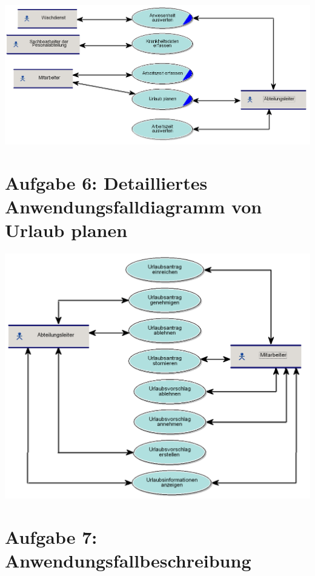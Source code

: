 \begin{center}
	\includegraphics[width=0.9\linewidth]{GrobesAnwendungsfalldiagramm.PNG}
\end{center}


\chapter*{Aufgabe 6: Detailliertes Anwendungsfalldiagramm von Urlaub planen}
\setcounter{section}{0}
\addtocounter{chapter}{1}

\begin{center}
	\includegraphics[width=0.9\linewidth]{UrlaubPlanen_AWF.PNG}
\end{center}

\chapter*{Aufgabe 7: Anwendungsfallbeschreibung}
\setcounter{section}{0}
\addtocounter{chapter}{1}

